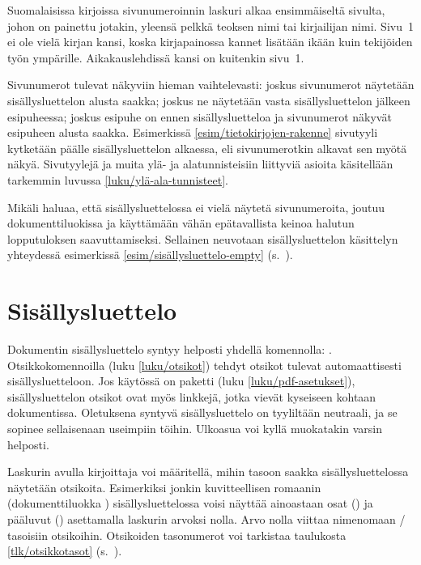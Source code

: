 Suomalaisissa kirjoissa sivunumeroinnin laskuri alkaa ensimmäiseltä
sivulta, johon on painettu jotakin, yleensä pelkkä teoksen nimi tai
kirjailijan nimi. Sivu~1 ei ole vielä kirjan kansi, koska kirjapainossa
kannet lisätään ikään kuin tekijöiden työn ympärille. Aikakauslehdissä
kansi on kuitenkin sivu~1.

Sivunumerot tulevat näkyviin hieman vaihtelevasti: joskus sivunumerot
näytetään sisällysluettelon alusta saakka; joskus ne näytetään vasta
sisällysluettelon jälkeen esipuheessa; joskus esipuhe on ennen
sisällysluetteloa ja sivunumerot näkyvät esipuheen alusta saakka.
Esimerkissä \ref{esim/tietokirjojen-rakenne} sivutyyli 
kytketään päälle sisällysluettelon alkaessa, eli sivunumerotkin alkavat
sen myötä näkyä. Sivutyylejä ja muita ylä- ja alatunnisteisiin liittyviä
asioita käsitellään tarkemmin luvussa \ref{luku/ylä-ala-tunnisteet}.

Mikäli haluaa, että sisällysluettelossa ei vielä näytetä sivunumeroita,
joutuu dokumenttiluokissa  ja  käyttämään
vähän epätavallista keinoa halutun lopputuloksen saavuttamiseksi.
Sellainen neuvotaan sisällysluettelon käsittelyn yhteydessä esimerkissä
\ref{esim/sisällysluettelo-empty}
(s.~\pageref{esim/sisällysluettelo-empty}).

\section{Sisällysluettelo}
\label{luku/sisällysluettelo}

Dokumentin sisällysluettelo syntyy helposti yhdellä komennolla:
. Otsikkokomennoilla (luku \ref{luku/otsikot})
tehdyt otsikot tulevat automaattisesti sisällysluetteloon. Jos käytössä
on paketti  (luku \ref{luku/pdf-asetukset}),
sisällysluettelon otsikot ovat myös linkkejä, jotka vievät kyseiseen
kohtaan dokumentissa. Oletuksena syntyvä sisällysluettelo on tyyliltään
neutraali, ja se sopinee sellaisenaan useimpiin töihin. Ulkoasua voi
kyllä muokatakin varsin helposti.

\begin{koodilohkosis}
\tableofcontents
\end{koodilohkosis}

\noindent
Laskurin  avulla kirjoittaja voi määritellä, mihin
tasoon saakka sisällysluettelossa näytetään otsikoita. Esimerkiksi
jonkin kuvitteellisen romaanin (dokumenttiluokka )
sisällysluettelossa voisi näyttää ainoastaan osat () ja
pääluvut () asettamalla laskurin arvoksi nolla. Arvo
nolla viittaa nimenomaan \-/ tasoisiin otsikoihin.
Otsikoiden tasonumerot voi tarkistaa taulukosta \ref{tlk/otsikkotasot}
(s.~\pageref{tlk/otsikkotasot}).

